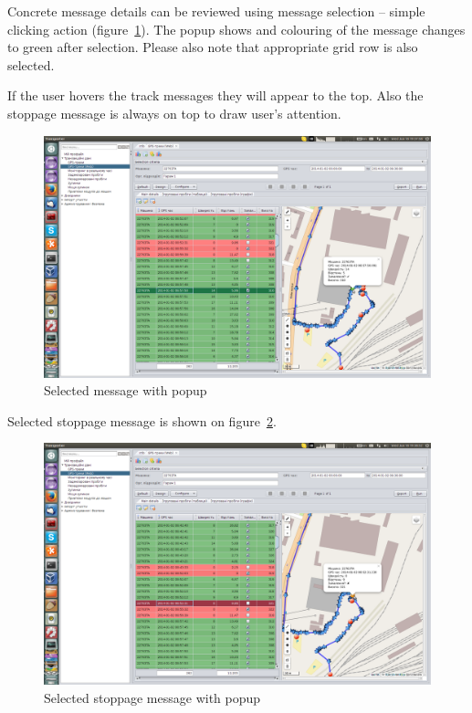 \newpage
Concrete message details can be reviewed using message selection -- simple clicking action (figure~\ref{fig:16}). The popup shows and colouring of the message changes to green after selection. Please also note that appropriate grid row is also selected. 

If the user hovers the track messages they will appear to the top. Also the stoppage message is always on top to draw user's attention.

\begin{figure}[H]
\centering
\includegraphics[width=\linewidth]{chapters/02-gpstracks/images/16-selected-message-with-popup.png}
\caption{Selected message with popup}\label{fig:16}
\end{figure}

\newpage
Selected stoppage message is shown on figure~\ref{fig:17}.

\begin{figure}[H]
\centering
\includegraphics[width=\linewidth]{chapters/02-gpstracks/images/17-selected-stoppage-with-popup.png}
\caption{Selected stoppage message with popup}\label{fig:17}
\end{figure}

